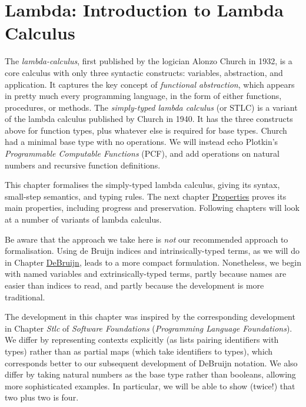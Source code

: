 \hypertarget{Lambda}{%
\chapter{Lambda: Introduction to Lambda Calculus}\label{Lambda}}

\begin{fence}
\begin{code}%
\>[0]\AgdaSpace{}%
\AgdaSpace{}%
\<%
\end{code}
\end{fence}

The \emph{lambda-calculus}, first published by the logician Alonzo
Church in 1932, is a core calculus with only three syntactic constructs:
variables, abstraction, and application. It captures the key concept of
\emph{functional abstraction}, which appears in pretty much every
programming language, in the form of either functions, procedures, or
methods. The \emph{simply-typed lambda calculus} (or STLC) is a variant
of the lambda calculus published by Church in 1940. It has the three
constructs above for function types, plus whatever else is required for
base types. Church had a minimal base type with no operations. We will
instead echo Plotkin's \emph{Programmable Computable Functions} (PCF),
and add operations on natural numbers and recursive function
definitions.

This chapter formalises the simply-typed lambda calculus, giving its
syntax, small-step semantics, and typing rules. The next chapter
\protect\hyperlink{Properties}{Properties} proves its main properties,
including progress and preservation. Following chapters will look at a
number of variants of lambda calculus.

Be aware that the approach we take here is \emph{not} our recommended
approach to formalisation. Using de Bruijn indices and
intrinsically-typed terms, as we will do in Chapter
\protect\hyperlink{DeBruijn}{DeBruijn}, leads to a more compact
formulation. Nonetheless, we begin with named variables and
extrinsically-typed terms, partly because names are easier than indices
to read, and partly because the development is more traditional.

The development in this chapter was inspired by the corresponding
development in Chapter \emph{Stlc} of \emph{Software Foundations}
(\emph{Programming Language Foundations}). We differ by representing
contexts explicitly (as lists pairing identifiers with types) rather
than as partial maps (which take identifiers to types), which
corresponds better to our subsequent development of DeBruijn notation.
We also differ by taking natural numbers as the base type rather than
booleans, allowing more sophisticated examples. In particular, we will
be able to show (twice!) that two plus two is four.

